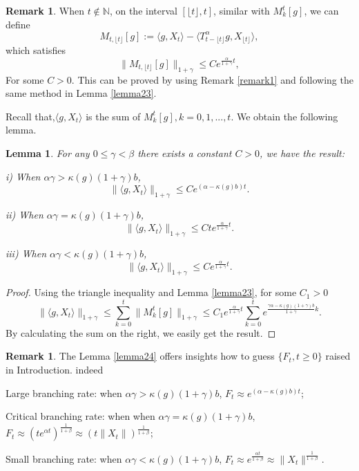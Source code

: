 \documentclass[12pt, a4paper]{amsart}
\newtheorem{lem}[thm]{Lemma}
\theoremstyle{definition}
\newtheorem{rem}[thm]{Remark}
\numberwithin{equation}{section}
\begin{document}
\begin{rem}\label{remark2}
   When $t\notin \mathbb{N}$, on the interval $[\lfloor t \rfloor , t]$, similar with $M_k^t[g]$, we can define 
   $$M_{t,\lfloor t \rfloor}[g]:=\langle g,X_t\rangle-\langle T^{\alpha}_{t-\lfloor t \rfloor}g,X_{\lfloor t \rfloor}\rangle,$$
   which satisfies 
   $$\|M_{t,\lfloor t \rfloor}[g]\|_{1+\gamma}\leq C e^{\frac{\alpha}{1+\gamma}t},$$
   For some $C>0$. This can be proved by using Remark \ref{remark1} and following the same method in Lemma \ref{lemma23}.
\end{rem}

Recall that,$\langle g,X_t\rangle$ is the sum of $M_k^{t}[g], k=0,1,...,t$. We obtain the following lemma. 

\begin{lem}\label{lemma24}
For any $0\leq \gamma < \beta$ there exists a constant $C>0$, we have the result:

i) When $\alpha\gamma > \kappa(g)(1+\gamma)b$,
$$\|\langle g,X_t\rangle\|_{1+\gamma}\leq C e^{(\alpha-\kappa(g)b)t}.$$

ii) When  $\alpha\gamma = \kappa(g)(1+\gamma)b$,
$$\|\langle g,X_t\rangle\|_{1+\gamma}\leq C te^{\frac{\alpha}{1+\gamma}t}.$$

iii) When $\alpha\gamma < \kappa(g)(1+\gamma)b$,
$$\|\langle g,X_t\rangle\|_{1+\gamma}\leq C e^{\frac{\alpha}{1+\gamma}t}.$$

\end{lem}
\begin{proof}
Using the triangle inequality and Lemma \eqref{lemma23}, for some $C_1>0$
$$\|\langle g,X_t\rangle\|_{1+\gamma}\leq \sum_{k=0}^{t}\|M_k^t[g]\|_{1+\gamma}\leq C_1 e^{\frac{\alpha}{1+\gamma}t}\sum_{k=0}^t e^{\frac{\gamma\alpha-\kappa(g)(1+\gamma)b}{1+\gamma}k}.$$
By calculating the sum on the right, we easily get the result. 
\end{proof} 

\begin{rem}
    The Lemma \eqref{lemma24} offers insights how to guess $\{F_t, t\geq0\}$ raised in Introduction. indeed
    
    Large branching rate: when $\alpha\gamma > \kappa(g)(1+\gamma)b$, $F_t\approx e^{(\alpha-\kappa(g)b)t} $; 
    
    Critical branching rate: when when  $\alpha\gamma = \kappa(g)(1+\gamma)b$, $F_t\approx (te^{\alpha t})^{\frac{1}{1+\beta}}\approx(t\|X_t\|)^{\frac{1}{1+\beta}}$;
    
    
    Small branching rate: when $\alpha\gamma < \kappa(g)(1+\gamma)b$, $F_t\approx e^{\frac{\alpha t}{1+\beta}}\approx \|X_t\|^{\frac{1}{1+\beta}}$.
\end{rem}
\end{document}
